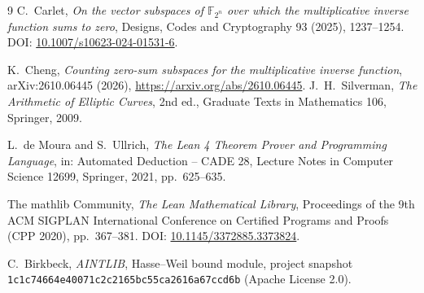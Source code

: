 \documentclass[UTF8,a4paper,11pt]{ctexart}
\numberwithin{equation}{section}
\theoremstyle{definition}
\theoremstyle{remark}
\begin{document}
\sloppy\begin{thebibliography}{9}\small
{}
C.~Carlet, \emph{On the vector subspaces of $\mathbb F_{2^n}$ over which the multiplicative inverse function sums to zero}, Designs, Codes and Cryptography 93 (2025), 1237--1254. DOI: \href{https://doi.org/10.1007/s10623-024-01531-6}{10.1007/s10623-024-01531-6}.

K.~Cheng, \emph{Counting zero-sum subspaces for the multiplicative inverse function}, arXiv:2610.06445 (2026), \url{https://arxiv.org/abs/2610.06445}.
J.~H.~Silverman, \emph{The Arithmetic of Elliptic Curves}, 2nd ed., Graduate Texts in Mathematics 106, Springer, 2009.

L.~de Moura and S.~Ullrich, \emph{The Lean 4 Theorem Prover and Programming Language}, in: Automated Deduction -- CADE 28, Lecture Notes in Computer Science 12699, Springer, 2021, pp.~625--635.

The mathlib Community, \emph{The Lean Mathematical Library}, Proceedings of the 9th ACM SIGPLAN International Conference on Certified Programs and Proofs (CPP 2020), pp.~367--381. DOI: \href{https://doi.org/10.1145/3372885.3373824}{10.1145/3372885.3373824}.

C.~Birkbeck, \emph{AINTLIB}, Hasse--Weil bound module, project snapshot \texttt{1c1c7466\allowbreak 4e40071c\allowbreak 2c2165bc\allowbreak 55ca2616\allowbreak a67ccd6b} (Apache License 2.0).
\end{thebibliography}
\end{document}
